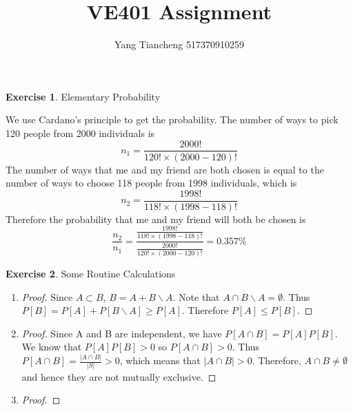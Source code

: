 \documentclass[12pt,a4paper]{article}
\makeatletter
\theoremstyle{definition}
\newtheorem{exercise}{Exercise}
\newtheorem*{solution}{Solution}
\renewenvironment{solution}[1][Solution] {\par\pushQED{\qed}\normalfont\topsep6\p@\@plus6\p@\relax\trivlist\item[\hskip\labelsep\bfseries#1\@addpunct{.}]\ignorespaces}{\popQED\endtrivlist\@endpefalse} \makeatother
\makeatother
\begin{document}
\title{VE401 Assignment}
\author{Yang Tiancheng 517370910259}
\maketitle

\newpage

\begin{exercise}
Elementary Probability
\begin{solution}
We use Cardano's principle to get the probability. The number of ways to pick 120 people from 2000 individuals is
$$n_1=\frac{2000!}{120!\times(2000-120)!}$$
The number of ways that me and my friend are both chosen is equal to the number of ways to choose 118 people from 1998 individuals, which is
$$n_2=\frac{1998!}{118!\times(1998-118)!}$$
Therefore the probability that me and my friend will both be chosen is
$$\frac{n_2}{n_1}=\frac{\frac{1998!}{118!\times(1998-118)!}}{\frac{2000!}{120!\times(2000-120)!}}=0.357\%$$
\end{solution}
\end{exercise}

\begin{exercise}
Some Routine Calculations
\begin{enumerate}[label=\roman*)]
\item
\begin{proof}
    Since $A\subset B$, $B=A+B\backslash A$. Note that $A \cap B \backslash A = \emptyset $. Thus $P[B]=P[A]+P[B\backslash A]\geq P[A]$. Therefore $P[A]\leq P[B]$.
\end{proof}
\item
\begin{proof}
    Since A and B are independent, we have $P[A\cap B]=P[A]P[B]$. We know that $P[A]P[B]>0$ so $P[A\cap B]>0$. Thus $P[A\cap B]=\frac{|A\cap B|}{|S|}>0$, which means that $|A\cap B|> 0$. Therefore, $A\cap B\neq \emptyset$ and hence they are not mutually exclusive.
\end{proof}
\item
\begin{proof}
\end{proof}
\end{enumerate}
\end{exercise}

 
\end{document}
